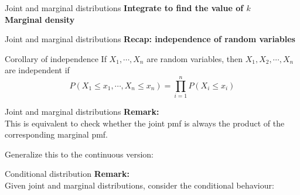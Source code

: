 \documentclass [aspectratio=169]{beamer}
\begin{document}
\begin{frame}{Joint and marginal distributions}
\textbf{Integrate to find the value of $k$}\\
\vspace{1in}
\textbf{Marginal density}\\
\vspace{1in}
\end{frame}



\begin{frame}{Joint and marginal distributions}
\textbf{Recap: independence of random variables}\\
 \begin{block}{Corollary of independence}
     If $X_1, \cdots, X_n$ are random variables, then $X_1, X_2, \cdots, X_n$ are independent if 
     $$
        P(X_1 \le x_1, \cdots, X_n \le x_n) = \prod_{i = 1}^n P(X_i \le x_i)
     $$
 \end{block}
 \vspace{0.1in}
\end{frame}


\begin{frame}{Joint and marginal distributions}
\textbf{Remark:}\\
 This is equivalent to check whether the joint pmf is always the product of the corresponding marginal pmf. \\
 \vspace{0.1in}
 
Generalize this to the continuous version:
\end{frame}

\begin{frame}{Conditional distribution}
\textbf{Remark:}\\
 Given joint and marginal distributions, consider the conditional behaviour: \\
 \vspace{0.1in}
\end{frame}
\end{document}
